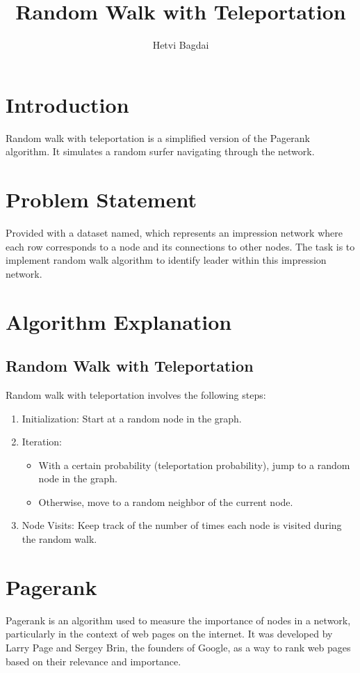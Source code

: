 \documentclass{article}
\title{Random Walk with Teleportation}
\author{Hetvi Bagdai}
\begin{document}
\maketitle

\section{Introduction}
Random walk with teleportation is a simplified version of the Pagerank algorithm. It simulates a random surfer navigating through the network.

\section{Problem Statement}
Provided with a dataset named, which represents an impression network where each row corresponds to a node and its connections to other nodes. The task is to implement random walk algorithm to identify leader within this impression network.
\section{Algorithm Explanation}
\subsection{Random Walk with Teleportation}
Random walk with teleportation involves the following steps:
\begin{enumerate}
    \item Initialization: Start at a random node in the graph.
    \item Iteration:
    \begin{itemize}
        \item With a certain probability (teleportation probability), jump to a random node in the graph.
        \item Otherwise, move to a random neighbor of the current node.
    \end{itemize}
    \item Node Visits: Keep track of the number of times each node is visited during the random walk.
\end{enumerate}
\section{Pagerank}
Pagerank is an algorithm used to measure the importance of nodes in a network, particularly in the context of web pages on the internet. It was developed by Larry Page and Sergey Brin, the founders of Google, as a way to rank web pages based on their relevance and importance.
\end{document}
